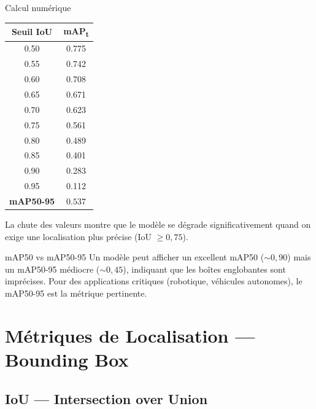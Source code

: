 \documentclass[12pt, a4paper]{report}
\begin{document}
\begin{examplebox}{Calcul numérique}
  \begin{center}
  \begin{tabular}{cc}
    \toprule
    \textbf{Seuil IoU} & \textbf{mAP\textsubscript{t}} \\
    \midrule
    0.50 & 0.775 \\
    0.55 & 0.742 \\
    0.60 & 0.708 \\
    0.65 & 0.671 \\
    0.70 & 0.623 \\
    0.75 & 0.561 \\
    0.80 & 0.489 \\
    0.85 & 0.401 \\
    0.90 & 0.283 \\
    0.95 & 0.112 \\
    \midrule
    \textbf{mAP50-95} & $\mathbf{0.537}$ \\
    \bottomrule
  \end{tabular}
  \end{center}
  La chute des valeurs montre que le modèle se dégrade significativement quand
  on exige une localisation plus précise (IoU $\geq 0{,}75$).
\end{examplebox}

\begin{warningbox}{mAP50 vs mAP50-95}
  Un modèle peut afficher un excellent mAP50 ($\sim\!0{,}90$) mais un mAP50-95
  médiocre ($\sim\!0{,}45$), indiquant que les boîtes englobantes sont imprécises.
  Pour des applications critiques (robotique, véhicules autonomes), le mAP50-95
  est la métrique pertinente.
\end{warningbox}

\chapter{Métriques de Localisation — Bounding Box}

\section{IoU — Intersection over Union}
\end{document}
